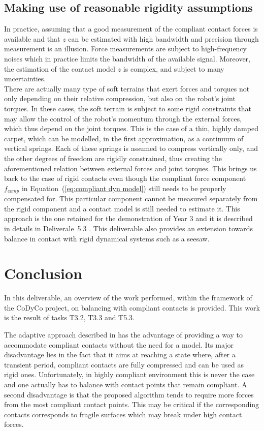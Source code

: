 \documentclass[12pt,a4paper,twoside]{article}
\begin{document}
\subsection{Making use of reasonable rigidity assumptions}

In practice, assuming that a good measurement of the compliant contact forces is available and that $z$ can be estimated with high bandwidth and precision through measurement is an illusion. Force measurements are subject to high-frequency noises which in practice limits the bandwidth of the available signal. Moreover, the estimation of the contact model $z$ is complex, and subject to many uncertainties.\\

There are actually many type of soft terrains that exert forces and torques not only depending on their relative compression, but also on the robot’s joint torques. In these cases, the soft terrain is subject to some rigid constraints that may allow the control of the robot's momentum through the external forces, which thus depend on the joint torques. This is the case of a thin, highly damped carpet, which can be modelled, in the first approximation, as a continuum of vertical springs. Each of these springs is assumed to compress vertically only, and the other degrees of freedom are rigidly constrained, thus creating the aforementioned relation between external forces and joint torques. This brings us back to the case of rigid contacts even though the compliant force component $f_{comp}$ in Equation~(\ref{eq:compliant dyn model}) still needs to be properly compensated for. This particular component cannot be measured separately from the rigid component and a contact model is still needed to estimate it. This approach is the one retained for the demonstration of Year 3 and it is described in details in Deliverale~5.3 \cite{deliverable53}. This deliverable also provides an extension towards balance in contact with rigid dynamical systems such as a seesaw.

\section{Conclusion}

In this deliverable, an overview of the work performed, within the framework of the CoDyCo project, on balancing with compliant contacts is provided. This work is the result of tasks T3.2, T3.3 and T5.3.

The adaptive approach described in \cite{liu_IROS2015} has the advantage of providing a way to accommodate compliant contacts without the need for a model. Its major disadvantage lies in the fact that it aims at reaching a state where, after a transient period, compliant contacts are fully compressed and can be used as rigid ones. Unfortunately, in highly compliant environment this is never the case and one actually has to balance with contact points that remain compliant. A second disadvantage is that the proposed algorithm tends to require  more forces from the most compliant contact points. This may be critical if the corresponding contacts corresponds to fragile surfaces which may break under high contact forces.\\
\end{document}
